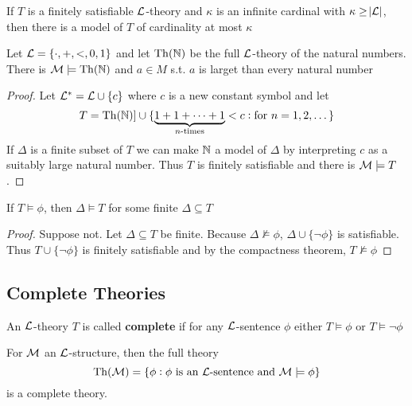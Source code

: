 \documentclass[11pt]{article}
\begin{document}
\begin{theorem}
\label{thm2.1.11}
If \(T\) is a finitely satisfiable \(\mathcal{L}\)-theory and \(\kappa\) is an infinite
cardinal with \(\kappa\ge\abs{\mathcal{L}}\), then there is a model of \(T\) of
cardinality at most \(\kappa\)
\end{theorem}

\begin{proposition}[]
Let \(\mathcal{L}=\{\cdot,+,<,0,1\}\) and let \(\operatorname{Th}(\mathbb{N})\) be the full \(\mathcal{L}\)-theory
of the natural numbers. There is \(\mathcal{M}\models\operatorname{Th}(\mathbb{N})\) and \(a\in M\) s.t. \(a\)
is larget than every natural number
\end{proposition}

\begin{proof}
Let \(\mathcal{L}^*=\mathcal{L}\cup\{c\}\) where \(c\) is a new constant symbol and let
\begin{equation*}
T=\operatorname{Th}(\mathbb{N})]\cup\{\underbrace{1+1+\dots+1}_{n\text{-times}}<c:\text{for }n=1,2,\dots\} 
\end{equation*}
If \(\Delta\) is a finite subset of \(T\) we can make \(\mathbb{N}\) a model of \(\Delta\) by
interpreting \(c\) as a suitably large natural number. Thus \(T\) is finitely
satisfiable and there is \(\mathcal{M}\models T\).
\end{proof}
\begin{lemma}[]
If \(T\models\phi\), then \(\Delta\models T\) for some finite \(\Delta\subseteq T\)
\end{lemma}
\begin{proof}
Suppose not. Let \(\Delta\subseteq T\) be finite. Because
\(\Delta\not\models\phi\), \(\Delta\cup\{\neg\phi\}\) is satisfiable. Thus
\(T\cup\{\neg\phi\}\) is finitely satisfiable and by the compactness theorem,
\(T\not\models\phi\) 
\end{proof}



\subsection{Complete Theories}
\label{sec:org5467511}
\begin{definition}[]
An \(\mathcal{L}\)-theory \(T\) is called \textbf{complete} if for any \(\mathcal{L}\)-sentence \(\phi\)
either \(T\models\phi\) or \(T\models\neg\phi\)
\end{definition}

For \(\mathcal{M}\) an \(\mathcal{L}\)-structure, then the full theory
\begin{equation*}
\operatorname{Th}(\mathcal{M})=\{\phi:\phi\text{ is an }\mathcal{L}\text{-sentence and }
\mathcal{M}\models\phi\}
\end{equation*}
is a complete theory.
\end{document}
